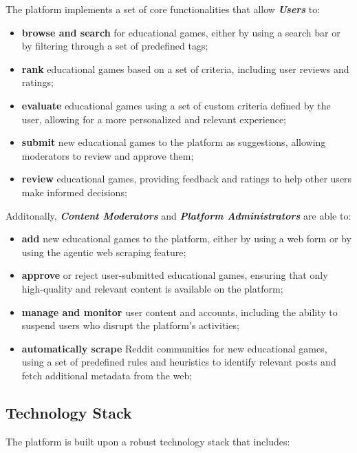 \documentclass[11pt,italian,a4paper]{article}
\begin{document}
The platform implements a set of core functionalities that allow \textbf{\textit{Users}} to:
\begin{itemize}
    \item \textbf{browse and search} for educational games, either by using a search bar or by filtering through a set of predefined tags;
    \item \textbf{rank} educational games based on a set of criteria, including user reviews and ratings;
    \item \textbf{evaluate} educational games using a set of custom criteria defined by the user, allowing for a more personalized and relevant experience;
    \item \textbf{submit} new educational games to the platform as suggestions, allowing moderators to review and approve them;
    \item \textbf{review} educational games, providing feedback and ratings to help other users make informed decisions;
\end{itemize}

\noindent Additonally, \textbf{\textit{Content Moderators}} and \textbf{\textit{Platform Administrators}} are able to:
\begin{itemize}
    \item \textbf{add} new educational games to the platform, either by using a web form or by using the agentic web scraping feature;
    \item \textbf{approve} or reject user-submitted educational games, ensuring that only high-quality and relevant content is available on the platform;
    \item \textbf{manage and monitor} user content and accounts, including the ability to suspend users who disrupt the platform's activities;
    \item \textbf{automatically scrape} Reddit communities for new educational games, using a set of predefined rules and heuristics to identify relevant posts and fetch additional metadata from the web;
\end{itemize}

\subsection{Technology Stack}
The platform is built upon a robust technology stack that includes:
\end{document}
